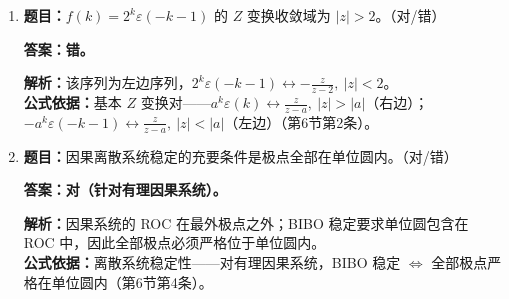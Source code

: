 \documentclass[12pt,a4paper]{ctexart}
\newcommand{\eps}{\varepsilon}
\begin{document}
\begin{enumerate}[label=\arabic*.]
\item \textbf{题目：}\(\displaystyle f(k)=2^k\eps(-k-1)\) 的 $Z$ 变换收敛域为 $|z|>2$。（对/错）\par
\textbf{答案：错。}\par
\textbf{解析：}该序列为左边序列，\(\displaystyle 2^k\eps(-k-1)\longleftrightarrow-\frac{z}{z-2},\ |z|<2\)。\\
\textbf{公式依据：}基本 $Z$ 变换对——$a^k\eps(k)\longleftrightarrow\frac{z}{z-a},\ |z|>|a|$（右边）；$-a^k\eps(-k-1)\longleftrightarrow\frac{z}{z-a},\ |z|<|a|$（左边）（第6节第2条）。

\item \textbf{题目：}因果离散系统稳定的充要条件是极点全部在单位圆内。（对/错）\par
\textbf{答案：对（针对有理因果系统）。}\par
\textbf{解析：}因果系统的 ROC 在最外极点之外；BIBO 稳定要求单位圆包含在 ROC 中，因此全部极点必须严格位于单位圆内。\\
\textbf{公式依据：}离散系统稳定性——对有理因果系统，BIBO 稳定 $\iff$ 全部极点严格在单位圆内（第6节第4条）。
\end{enumerate}
\end{document}
